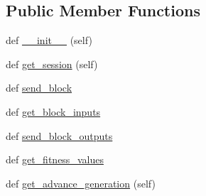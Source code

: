 \subsection*{Public Member Functions}
\begin{DoxyCompactItemize}
\item 
def \hyperlink{classNEAT__PyGenetics_1_1NEAT_1_1Networking_1_1Server_1_1SimulationConnector_1_1SimulationConnector_a3efe4fc8a7d68cfd454fbaf0e981bee5}{\+\_\+\+\_\+init\+\_\+\+\_\+} (self)
\item 
def \hyperlink{classNEAT__PyGenetics_1_1NEAT_1_1Networking_1_1Server_1_1SimulationConnector_1_1SimulationConnector_af5849c17a1aa5ef6bc4f9e1f798fe00c}{get\+\_\+session} (self)
\item 
def \hyperlink{classNEAT__PyGenetics_1_1NEAT_1_1Networking_1_1Server_1_1SimulationConnector_1_1SimulationConnector_a4984c0604704e1808a51050274c7a56e}{send\+\_\+block}
\item 
def \hyperlink{classNEAT__PyGenetics_1_1NEAT_1_1Networking_1_1Server_1_1SimulationConnector_1_1SimulationConnector_a193505d0bf3a8dfa0063b7aca22cd84b}{get\+\_\+block\+\_\+inputs}
\item 
def \hyperlink{classNEAT__PyGenetics_1_1NEAT_1_1Networking_1_1Server_1_1SimulationConnector_1_1SimulationConnector_a82d0ed025654632c25d2241aef9024cc}{send\+\_\+block\+\_\+outputs}
\item 
def \hyperlink{classNEAT__PyGenetics_1_1NEAT_1_1Networking_1_1Server_1_1SimulationConnector_1_1SimulationConnector_af63e36b9eb1e3dcc9d58e437d251cc35}{get\+\_\+fitness\+\_\+values}
\item 
def \hyperlink{classNEAT__PyGenetics_1_1NEAT_1_1Networking_1_1Server_1_1SimulationConnector_1_1SimulationConnector_a5a07ea6d6971102b7dbe65e8fbaeb2c6}{get\+\_\+advance\+\_\+generation} (self)
\end{DoxyCompactItemize}
